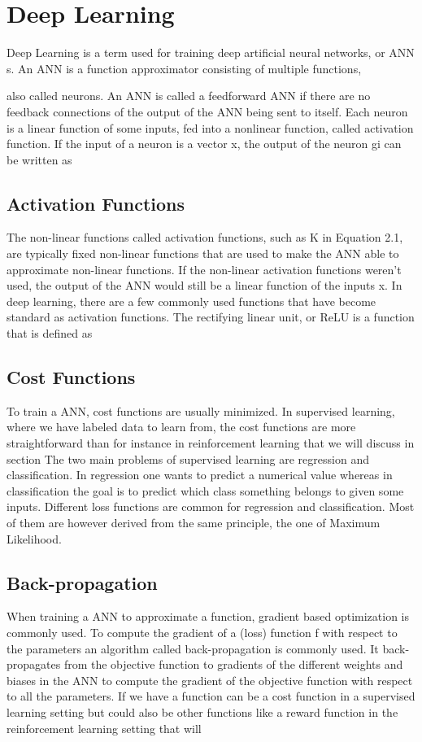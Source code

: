 \section{Deep Learning}
Deep Learning is a term used for training deep artificial neural networks, or
ANN s. An ANN is a function approximator consisting of multiple functions,

also called neurons. An ANN is called a feedforward ANN if there are no
feedback connections of the output of the ANN being sent to itself. Each neuron
is a linear function of some inputs, fed into a nonlinear function, called activation
function. If the input of a neuron is a vector x, the output of the neuron gi can
be written as


\subsection{Activation Functions}
The non-linear functions called activation functions, such as K in Equation 2.1,
are typically fixed non-linear functions that are used to make the ANN able to
approximate non-linear functions. If the non-linear activation functions weren’t
used, the output of the ANN would still be a linear function of the inputs x. In deep learning, there are a few commonly used functions that
have become standard as activation functions.
The rectifying linear unit, or ReLU is a function that is defined as

\subsection{Cost Functions}
To train a ANN, cost functions are usually minimized. In supervised learning, where we have labeled data to learn from, the cost functions are more
straightforward than for instance in reinforcement learning that we will discuss
in section 
The two main problems of supervised learning are regression and classification.
In regression one wants to predict a numerical value whereas in classification the
goal is to predict which class something belongs to given some inputs. Different
loss functions are common for regression and classification. Most of them are
however derived from the same principle, the one of Maximum Likelihood.

\subsection{Back-propagation}
When training a ANN to approximate a function, gradient based optimization
is commonly used. To compute the gradient of a (loss) function f with
respect to the parameters  an algorithm called back-propagation is commonly
used. It back-propagates from the objective function to gradients of the different
weights and biases in the ANN to compute the gradient of the objective function with respect to all the parameters. If we have a function 
can be a cost function in a supervised learning setting but could also be other
functions like a reward function in the reinforcement learning setting that will

